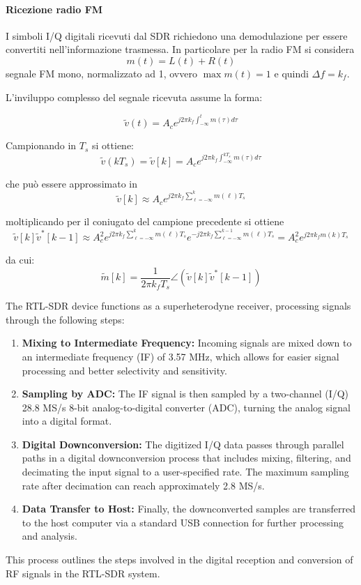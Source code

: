 \paragraph*{Ricezione radio FM}
I simboli I/Q digitali ricevuti dal SDR richiedono una demodulazione per essere convertiti nell'informazione trasmessa. In particolare per la radio FM si considera
\[
    m(t) = L(t) + R(t)
\]
segnale FM mono, normalizzato ad 1, ovvero $\max{m(t)} = 1$ e quindi $\Delta f = k_f$.


L'inviluppo complesso del segnale ricevuta assume la forma:

\[
    \tilde{v}(t) = A_c e^{j2\pi k_f \int_{-\infty}^{t} m(\tau) d\tau}
\]

Campionando in $T_s$ si ottiene:
\[
    \tilde{v}(kT_s) = \tilde{v}[k] = A_c e^{j2\pi k_f \int_{-\infty}^{kT_s} m(\tau) d\tau}
\]

che può essere approssimato in
\[
    \tilde{v}[k] \approx A_c e^{j2\pi k_f \sum_{\ell = -\infty}^{k} m(\ell) T_s}
\]

moltiplicando per il coniugato del campione precedente si ottiene
\[
  \tilde{v}[k] \tilde{v}^*[k-1] \approx A_c^2 e^{j2\pi k_f \sum_{\ell = -\infty}^{k} m(\ell) T_s} e^{-j2\pi k_f \sum_{\ell = -\infty}^{k-1} m(\ell) T_s} = A_c^2 e^{j2\pi k_f m(k) T_s}
\]


da cui:
\[
    \tilde{m}[k] = \frac{1}{2\pi k_f T_s} \angle \left( \tilde{v}[k] \tilde{v}^*[k-1] \right)
\]




The RTL-SDR device functions as a superheterodyne receiver, processing signals through the following steps:
\begin{enumerate}
    \item \textbf{Mixing to Intermediate Frequency:} Incoming signals are mixed down to an intermediate frequency (IF) of 3.57 MHz, which allows for easier signal processing and better selectivity and sensitivity.
    \item \textbf{Sampling by ADC:} The IF signal is then sampled by a two-channel (I/Q) 28.8 MS/s 8-bit analog-to-digital converter (ADC), turning the analog signal into a digital format.
    \item \textbf{Digital Downconversion:} The digitized I/Q data passes through parallel paths in a digital downconversion process that includes mixing, filtering, and decimating the input signal to a user-specified rate. The maximum sampling rate after decimation can reach approximately 2.8 MS/s.
    \item \textbf{Data Transfer to Host:} Finally, the downconverted samples are transferred to the host computer via a standard USB connection for further processing and analysis.
\end{enumerate}
This process outlines the steps involved in the digital reception and conversion of RF signals in the RTL-SDR system.



